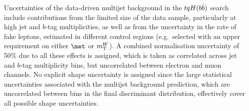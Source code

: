 Uncertainties of the data-driven multijet background in the $tqH(b\bar{b})$ search include
contributions from the limited size of the data sample, particularly at high jet and $b$-tag multiplicities, as 
well as from the uncertainty in the rate of fake leptons, estimated in 
different control regions (e.g.\ selected with an upper requirement on either $\met$ or $m_{\mathrm T}^W$). 
A combined normalisation uncertainty of 50\% due 
to all these effects is assigned, which is taken as correlated across jet
and $b$-tag multiplicity bins, but uncorrelated between electron and muon channels. 
No explicit shape uncertainty is assigned since the large statistical uncertainties associated with
the multijet background prediction, which are uncorrelated 
between bins in the final discriminant distribution, effectively cover all possible shape uncertainties. 

